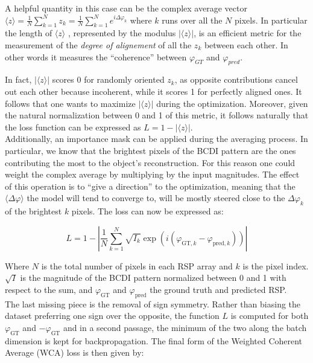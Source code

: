 A helpful quantity in this case can be the complex average vector $\langle z \rangle = \frac{1}{N}\sum_{k=1}^{N}z_k = \frac{1}{N}\sum_{k=1}^{N}e^{i\Delta\varphi_k}$
where $k$ runs over all the $N$ pixels. In particular the length of $\langle z \rangle$ , represented by the modulus $|\langle z \rangle|$,
is an efficient metric for the measurement of the \textit{degree of alignement} of all the $z_k$ between each other. 
In other words it measures the ``coherence'' between $\varphi_{GT}$ and $\varphi_{pred}$.

In fact, $|\langle z \rangle|$ scores 0 for randomly oriented $z_k$, as opposite contributions cancel out each other because 
incoherent, while it scores 1 for perfectly aligned ones. It follows that one wants to maximize $|\langle z \rangle|$ during the 
optimization. Moreover, given the natural normalization between 0 and 1 of this metric, it follows naturally that the loss 
function can be expressed as $ L =  1 - |\langle z \rangle| $. \\

Additionally, an importance mask can be applied during the averaging process. In particular, we know that the brightest 
pixels of the BCDI pattern are the ones contributing the most to the object's reconstruction. For this reason one could 
weight the complex average by multiplying by the input magnitudes. The effect of this operation is to ``give a direction'' to the 
optimization, meaning that the $\langle \Delta\varphi \rangle $ the model will tend to converge to, will be mostly steered close to 
the $\Delta\varphi_k$ of the brightest $k$ pixels. 
The loss can now be expressed as: 

\begin{equation}
    L = 1 - \left|\frac{1}{N}\sum_{k=1}^{N} \sqrt{I_{k}}\exp\left(i(\varphi_{\text{GT},k} - \varphi_{\text{pred},k})\right)\right|
\label{eq:WCA_1}
\end{equation}

Where $N$ is the total number of pixels in each RSP array and $k$ is the pixel index. $\sqrt{I}$ is the magnitude of the BCDI pattern 
normalized between 0 and 1 with respect to the sum, and $\varphi_{\text{GT}}$ and $ \varphi_{\text{pred}}$ the ground truth and 
predicted RSP. \\
The last missing piece is the removal of sign symmetry. Rather than biasing the dataset preferring one sign over the opposite, 
the function $L$ is computed for both $\varphi_{\text{GT}}$ and $-\varphi_{\text{GT}}$ and in a second passage, the minimum of the two 
along the batch dimension is kept for backpropagation. The final form of the Weighted Coherent Average (WCA) loss is then given 
by: 

